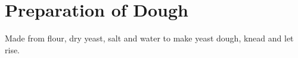 \chapter{Preparation of Dough}
Made from flour, dry yeast,
salt and water to make yeast dough,
knead and let rise.